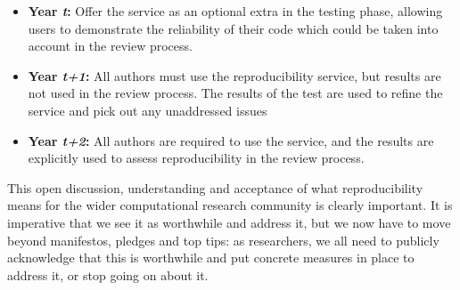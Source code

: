 \documentclass[conference]{IEEEtran}
\begin{document}
\begin{itemize}
\item {\textbf{Year {\emph{t}}:}} Offer the service as an optional extra in the
  testing phase, allowing users to demonstrate the reliability of
  their code which could be taken into account in the review process.
\item {\textbf{Year {\emph{t+1}}:}} All authors must use the reproducibility
  service, but results are not used in the review process. The results
  of the test are used to refine the service and pick out any
  unaddressed issues
\item {\textbf{Year {\emph{t+2}}:}} All authors are required to use the service, and
  the results are explicitly used to assess reproducibility in the
  review process.
\end{itemize}

This open discussion, understanding and acceptance of what
reproducibility means for the wider computational research community
is clearly important. It is imperative that we see it as worthwhile
and address it, but we now have to move beyond manifestos, pledges and
top tips: as researchers, we all need to publicly acknowledge that
this is worthwhile and put concrete measures in place to address it,
or stop going on about it.







\end{document}
